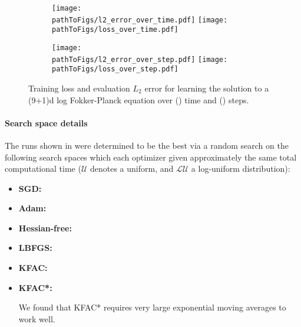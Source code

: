 \begin{figure}[!h]
  \centering
  \def\pathToFigs{kfac_pinns_exp/exp43_log_fokker_planck9d_isotropic_gaussian_random}
  \begin{subfigure}[t]{1.0\linewidth}
    \caption{}\label{subfig:fokker_10d-time}
    \texttt{[image: \\pathToFigs/l2\_error\_over\_time.pdf]}
    \texttt{[image: \\pathToFigs/loss\_over\_time.pdf]}
  \end{subfigure}
  \begin{subfigure}[t]{1.0\linewidth}
    \caption{}\label{subfig:fokker_10d-step}
    \texttt{[image: \\pathToFigs/l2\_error\_over\_step.pdf]}
    \texttt{[image: \\pathToFigs/loss\_over\_step.pdf]}
  \end{subfigure}
  \caption{Training loss and evaluation $L_2$ error for
    learning the solution to a (9+1)d log Fokker-Planck equation
    over () time and () steps.}\label{fig:fokker_10d-appendix}
\end{figure}

\paragraph{Search space details} The runs shown in
 were determined to be the best
via a random search on the following search spaces which each
optimizer given approximately the same total
computational time ($\mathcal{U}$ denotes a uniform,
and $\mathcal{LU}$ a log-uniform distribution):
\begin{itemize}
  \def\pathToRuns{kfac_pinns_exp/exp43_log_fokker_planck9d_isotropic_gaussian_random/tex}
\item \textbf{SGD:} 
\item \textbf{Adam:} 
\item \textbf{Hessian-free:} 
\item \textbf{LBFGS:} 
\item \textbf{KFAC:} 
\item \textbf{KFAC*:} 

  We found that KFAC* requires very large exponential moving averages to work well.
\end{itemize}
